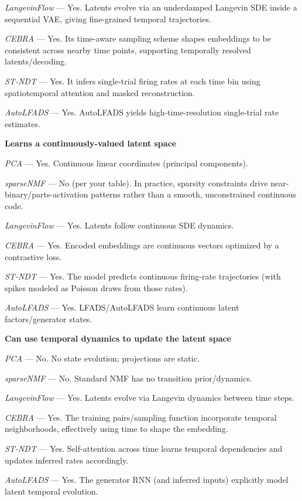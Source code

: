 \textit{LangevinFlow} — Yes. Latents evolve via an underdamped Langevin SDE inside a sequential VAE, giving fine-grained temporal trajectories.

\textit{CEBRA} — Yes. Its time-aware sampling scheme shapes embeddings to be consistent across nearby time points, supporting temporally resolved latents/decoding.

\textit{ST-NDT} — Yes. It infers single-trial firing rates at each time bin using spatiotemporal attention and masked reconstruction.

\textit{AutoLFADS} — Yes. AutoLFADS yields high-time-resolution single-trial rate estimates.

\textbf{Learns a continuously-valued latent space}

\textit{PCA} — Yes. Continuous linear coordinates (principal components).

\textit{sparseNMF} — No (per your table). In practice, sparsity constraints drive near-binary/parts-activation patterns rather than a smooth, unconstrained continuous code.

\textit{LangevinFlow} — Yes. Latents follow continuous SDE dynamics.

\textit{CEBRA} — Yes. Encoded embeddings are continuous vectors optimized by a contrastive loss.

\textit{ST-NDT} — Yes. The model predicts continuous firing-rate trajectories (with spikes modeled as Poisson draws from those rates).

\textit{AutoLFADS} — Yes. LFADS/AutoLFADS learn continuous latent factors/generator states.

\textbf{Can use temporal dynamics to update the latent space}

\textit{PCA} — No. No state evolution; projections are static.

\textit{sparseNMF} — No. Standard NMF has no transition prior/dynamics.

\textit{LangevinFlow} — Yes. Latents evolve via Langevin dynamics between time steps.

\textit{CEBRA} — Yes. The training pairs/sampling function incorporate temporal neighborhoods, effectively using time to shape the embedding.

\textit{ST-NDT} — Yes. Self-attention across time learns temporal dependencies and updates inferred rates accordingly.

\textit{AutoLFADS} — Yes. The generator RNN (and inferred inputs) explicitly model latent temporal evolution.

